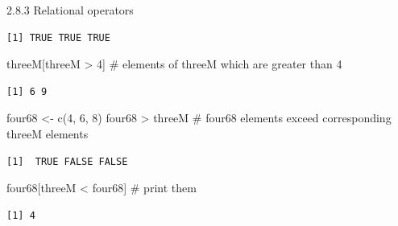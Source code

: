 \documentclass[
  9pt,
  a4paper,
  ignorenonframetext,
  notheorems]{beamer}
\newenvironment{Shaded}{\begin{snugshade}}{\end{snugshade}}
\newcommand{\CommentTok}[1]{\textcolor[rgb]{0.37,0.37,0.37}{#1}}
\newcommand{\DecValTok}[1]{\textcolor[rgb]{0.68,0.00,0.00}{#1}}
\newcommand{\FunctionTok}[1]{\textcolor[rgb]{0.28,0.35,0.67}{#1}}
\newcommand{\NormalTok}[1]{\textcolor[rgb]{0.00,0.23,0.31}{#1}}
\newcommand{\OtherTok}[1]{\textcolor[rgb]{0.00,0.23,0.31}{#1}}
\newcommand{\SpecialCharTok}[1]{\textcolor[rgb]{0.37,0.37,0.37}{#1}}
\begin{document}
\begin{frame}[fragile]
\begin{block}{2.8.3 Relational operators}
\begin{verbatim}
[1] TRUE TRUE TRUE
\end{verbatim}

\begin{Shaded}
\begin{Highlighting}[]
\NormalTok{threeM[threeM }\SpecialCharTok{\textgreater{}} \DecValTok{4}\NormalTok{] }\CommentTok{\# elements of threeM which are greater than 4}
\end{Highlighting}
\end{Shaded}

\begin{verbatim}
[1] 6 9
\end{verbatim}

\begin{Shaded}
\begin{Highlighting}[]
\NormalTok{four68 }\OtherTok{\textless{}{-}} \FunctionTok{c}\NormalTok{(}\DecValTok{4}\NormalTok{, }\DecValTok{6}\NormalTok{, }\DecValTok{8}\NormalTok{)}
\NormalTok{four68 }\SpecialCharTok{\textgreater{}}\NormalTok{ threeM }\CommentTok{\# four68 elements exceed corresponding threeM elements}
\end{Highlighting}
\end{Shaded}

\begin{verbatim}
[1]  TRUE FALSE FALSE
\end{verbatim}

\begin{Shaded}
\begin{Highlighting}[]
\NormalTok{four68[threeM }\SpecialCharTok{\textless{}}\NormalTok{ four68] }\CommentTok{\# print them}
\end{Highlighting}
\end{Shaded}

\begin{verbatim}
[1] 4
\end{verbatim}
\end{block}
\end{frame}
\end{document}
